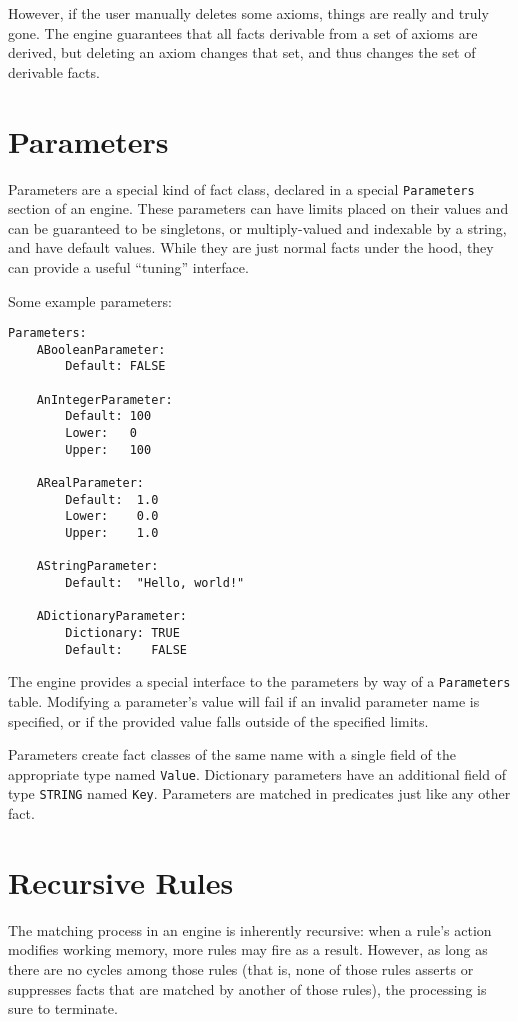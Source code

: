 \documentclass[letterpaper,10pt]{article}
\begin{document}
However, if the user manually deletes some axioms, things are really and truly gone.
The engine guarantees that all facts derivable from a set of axioms are derived, but deleting an axiom changes that set, and thus changes the set of derivable facts.

\section{Parameters}
Parameters are a special kind of fact class, declared in a special \texttt{Parameters} section of an engine.
These parameters can have limits placed on their values and can be guaranteed to be singletons, or multiply-valued and indexable by a string, and have default values.
While they are just normal facts under the hood, they can provide a useful ``tuning'' interface.

Some example parameters:
\begin{lstlisting}
Parameters:
    ABooleanParameter:
        Default: FALSE

    AnIntegerParameter:
        Default: 100
        Lower:   0
        Upper:   100

    ARealParameter:
        Default:  1.0
        Lower:    0.0
        Upper:    1.0

    AStringParameter:
        Default:  "Hello, world!"

    ADictionaryParameter:
        Dictionary: TRUE
        Default:    FALSE
\end{lstlisting}

The engine provides a special interface to the parameters by way of a \texttt{Parameters} table.
Modifying a parameter's value will fail if an invalid parameter name is specified, or if the provided value falls outside of the specified limits.

Parameters create fact classes of the same name with a single field of the appropriate type named \texttt{Value}.
Dictionary parameters have an additional field of type \texttt{STRING} named \texttt{Key}.
Parameters are matched in predicates just like any other fact.

\section{Recursive Rules}
The matching process in an engine is inherently recursive: when a rule's action modifies working memory, more rules may fire as a result.
However, as long as there are no cycles among those rules (that is, none of those rules asserts or suppresses facts that are matched by another of those rules), the processing is sure to terminate.
\end{document}
